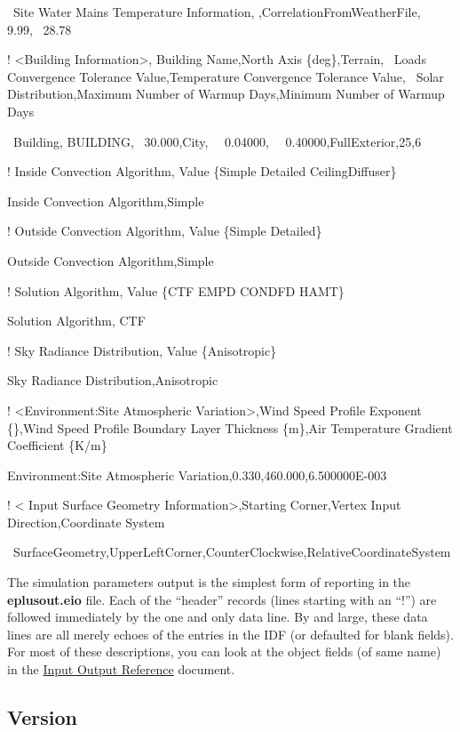 ~Site Water Mains Temperature Information, ,CorrelationFromWeatherFile,~ 9.99,~ 28.78

! \textless{}Building Information\textgreater{}, Building Name,North Axis \{deg\},Terrain,~ Loads Convergence Tolerance Value,Temperature Convergence Tolerance Value,~ Solar Distribution,Maximum Number of Warmup Days,Minimum Number of Warmup Days

~Building, BUILDING,~ 30.000,City,~~ 0.04000,~~ 0.40000,FullExterior,25,6

! Inside Convection Algorithm, Value \{Simple \textbar{} Detailed \textbar{} CeilingDiffuser\}

Inside Convection Algorithm,Simple

! Outside Convection Algorithm, Value \{Simple \textbar{} Detailed\}

Outside Convection Algorithm,Simple

! Solution Algorithm, Value \{CTF \textbar{} EMPD \textbar{} CONDFD \textbar{} HAMT\}

Solution Algorithm, CTF

! Sky Radiance Distribution, Value \{Anisotropic\}

Sky Radiance Distribution,Anisotropic

! \textless{}Environment:Site Atmospheric Variation\textgreater{},Wind Speed Profile Exponent \{\},Wind Speed Profile Boundary Layer Thickness \{m\},Air Temperature Gradient Coefficient \{K/m\}

Environment:Site Atmospheric Variation,0.330,460.000,6.500000E-003

! \textless{} Input Surface Geometry Information\textgreater{},Starting Corner,Vertex Input Direction,Coordinate System

~SurfaceGeometry,UpperLeftCorner,CounterClockwise,RelativeCoordinateSystem

The simulation parameters output is the simplest form of reporting in the \textbf{eplusout.eio} file. Each of the ``header'' records (lines starting with an ``!'') are followed immediately by the one and only data line. By and large, these data lines are all merely echoes of the entries in the IDF (or defaulted for blank fields). For most of these descriptions, you can look at the object fields (of same name) in the \href{https://energyplus.readthedocs.io/en/latest/guides/input-output-reference/index.html}{Input Output Reference} document.

\subsection{Version}\label{version}

